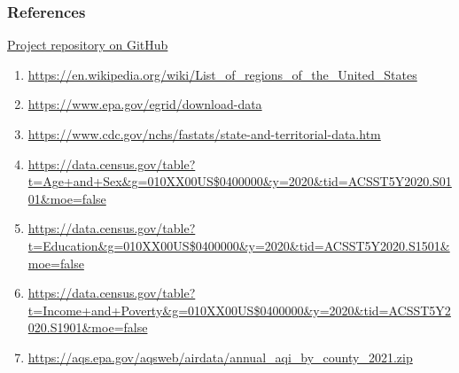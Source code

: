 \documentclass[
]{article}
\providecommand{\tightlist}{%
  \setlength{\itemsep}{0pt}\setlength{\parskip}{0pt}}
\begin{document}
\newpage

\hypertarget{references}{%
\subsubsection{References}\label{references}}

\href{https://github.com/Srishtimutha/EDA_Class_Project_Sp23}{Project
repository on GitHub}

\begin{enumerate}
\def\labelenumi{\arabic{enumi}.}
\tightlist
\item
  \url{https://en.wikipedia.org/wiki/List_of_regions_of_the_United_States}
\item
  \url{https://www.epa.gov/egrid/download-data}
\item
  \url{https://www.cdc.gov/nchs/fastats/state-and-territorial-data.htm}
\item
  \url{https://data.census.gov/table?t=Age+and+Sex\&g=010XX00US$0400000\&y=2020\&tid=ACSST5Y2020.S0101\&moe=false}
\item
  \url{https://data.census.gov/table?t=Education\&g=010XX00US$0400000\&y=2020\&tid=ACSST5Y2020.S1501\&moe=false}
\item
  \url{https://data.census.gov/table?t=Income+and+Poverty\&g=010XX00US$0400000\&y=2020\&tid=ACSST5Y2020.S1901\&moe=false}
\item
  \url{https://aqs.epa.gov/aqsweb/airdata/annual_aqi_by_county_2021.zip}
\end{enumerate}
\end{document}
